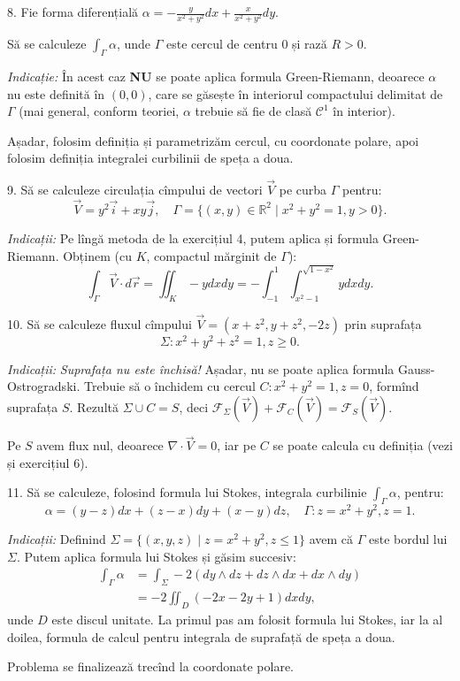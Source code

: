 \documentclass[11pt,a4paper]{article}
\newcommand\kal{\mathcal}
\newcommand\ds{\displaystyle}
\newcommand\RR{\mathbb{R}}
\theoremstyle{dotless}
\theoremstyle{dotlessdr}
\begin{document}
\vspace{1cm}

8. Fie forma diferențială $\alpha = -\frac{y}{x^2 + y^2} dx + \frac{x}{x^2 + y^2} dy$.

Să se calculeze $\ds\int_\Gamma \alpha$, unde $\Gamma$ este cercul de centru 0 și rază $R > 0$.

\emph{Indicație:} În acest caz \textbf{NU} se poate aplica formula Green-Riemann, deoarece
$\alpha$ nu este definită în $(0, 0)$, care se găsește în interiorul compactului delimitat de $\Gamma$
(mai general, conform teoriei, $\alpha$ trebuie să fie de clasă $\kal{C}^1$ în interior).

Așadar, folosim definiția și parametrizăm cercul, cu coordonate polare, apoi folosim
definiția integralei curbilinii de speța a doua.

\vspace{1cm}

9. Să se calculeze circulația cîmpului de vectori $\vec{V}$ pe curba $\Gamma$ pentru:
\[
  \vec{V} = y^2\vec{i} + xy\vec{j}, \quad \Gamma = \{(x, y) \in \RR^2 \mid x^2 + y^2 = 1, y > 0 \}.
\]

\emph{Indicații:} Pe lîngă metoda de la exercițiul 4, putem aplica și formula Green-Riemann.
Obținem (cu $K$, compactul mărginit de $\Gamma$):
\[
  \int_\Gamma \vec{V} \cdot d\vec{r} = \iint_K -ydxdy = -\int_{-1}^1 \int_{x^2 - 1}^{\sqrt{1-x^2}} ydxdy.
\]

\vspace{1cm}

10. Să se calculeze fluxul cîmpului $\vec{V} = (x + z^2, y + z^2, -2z)$
prin suprafața
\[
  \Sigma: x^2 + y^2 + z^2 = 1, z \geq 0.
\]

\emph{Indicații:} \emph{Suprafața nu este închisă!} Așadar, nu se poate aplica formula Gauss-Ostrogradski.
Trebuie să o închidem cu cercul $C: x^2 + y^2 = 1, z = 0$, formînd suprafața $S$. Rezultă
$\Sigma \cup C = S$, deci $\kal{F}_\Sigma(\vec{V}) + \kal{F}_C(\vec{V}) = \kal{F}_S(\vec{V})$.

Pe $S$ avem flux nul, deoarece $\nabla \cdot \vec{V} = 0$, iar pe $C$ se poate calcula cu definiția
(vezi și exercițiul 6).

\vspace{1cm}

11. Să se calculeze, folosind formula lui Stokes, integrala curbilinie $\int_\Gamma \alpha$,
pentru:
\[
  \alpha = (y - z)dx + (z - x)dy + (x - y)dz, \quad \Gamma: z = x^2 + y^2, z = 1.
\]

\emph{Indicații:} Definind $\Sigma = \{(x, y, z) \mid z = x^2 + y^2, z \leq 1\}$ avem că
$\Gamma$ este bordul lui $\Sigma$. Putem aplica formula lui Stokes și găsim succesiv:
\begin{align*}
  \int_\Gamma \alpha &= \int_\Sigma -2(dy \wedge dz + dz \wedge dx + dx \wedge dy) \\
                     &= -2 \iint_D (-2x - 2y + 1) dxdy,
\end{align*}
unde $D$ este discul unitate. La primul pas am folosit formula lui Stokes, iar la
al doilea, formula de calcul pentru integrala de suprafață de speța a doua.

Problema se finalizează trecînd la coordonate polare.
\end{document}
